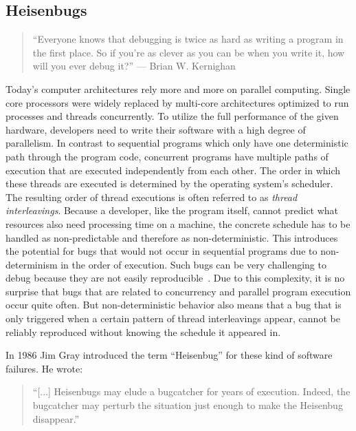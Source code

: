 \documentclass[conference]{IEEEtran}
\begin{document}
\subsection{Heisenbugs}

\begin{quote}
``Everyone knows that debugging is twice as hard as writing a program in the first place. So if you're as clever as you can be when you write it, how will you ever debug it?'' --- Brian W. Kernighan\cite{kernighan1974elements}
\end{quote}

Today's computer architectures rely more and more on parallel computing.
Single core processors were widely replaced by multi-core architectures optimized to run processes and threads concurrently.
To utilize the full performance of the given hardware, developers need to write their software with a high degree of parallelism.
In contrast to sequential programs which only have one deterministic path through the program code, concurrent programs have multiple paths of execution that are executed independently from each other.
The order in which these threads are executed is determined by the operating system's scheduler.
The resulting order of thread executions is often referred to as \emph{thread interleavings}.
Because a developer, like the program itself, cannot predict what resources also need processing time on a machine, the concrete schedule has to be handled as non-predictable and therefore as non-deterministic.
This introduces the potential for bugs that would not occur in sequential programs due to non-determinism in the order of execution.
Such bugs can be very challenging to debug because they are not easily reproducible~\cite{tu2019go}.
Due to this complexity, it is no surprise that bugs that are related to concurrency and parallel program execution occur quite often.
But non-deterministic behavior also means that a bug that is only triggered when a certain pattern of thread interleavings appear, cannot be reliably reproduced without knowing the schedule it appeared in.

In 1986 Jim Gray introduced the term ``Heisenbug'' for these kind of software failures.
He wrote:

\begin{quote}
``[...] Heisenbugs may elude a bugcatcher for years of execution. Indeed, the bugcatcher may perturb the situation just enough to make the Heisenbug disappear.''\cite{gray1986computers}
\end{quote}
\end{document}
